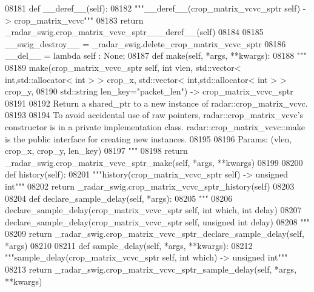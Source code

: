 \begin{DoxyCode}
{{{{{{{{{{{{{{{{{{{{{{{{{{{08181     \textcolor{keyword}{def }__deref__(self):
08182         \textcolor{stringliteral}{"""\_\_deref\_\_(crop\_matrix\_vcvc\_sptr self) -> crop\_matrix\_vcvc"""}
08183         \textcolor{keywordflow}{return} \_radar\_swig.crop\_matrix\_vcvc\_sptr\_\_\_deref\_\_(self)
08184 
08185     \_\_swig\_destroy\_\_ = \_radar\_swig.delete\_crop\_matrix\_vcvc\_sptr
08186     \_\_del\_\_ = \textcolor{keyword}{lambda} self : \textcolor{keywordtype}{None};
08187     \textcolor{keyword}{def }make(self, *args, **kwargs):
08188         \textcolor{stringliteral}{"""}
08189 \textcolor{stringliteral}{        make(crop\_matrix\_vcvc\_sptr self, int vlen, std::vector< int,std::allocator< int > > crop\_x,
       std::vector< int,std::allocator< int > > crop\_y, }
08190 \textcolor{stringliteral}{            std::string len\_key="packet\_len") -> crop\_matrix\_vcvc\_sptr}
08191 \textcolor{stringliteral}{}
08192 \textcolor{stringliteral}{        Return a shared\_ptr to a new instance of radar::crop\_matrix\_vcvc.}
08193 \textcolor{stringliteral}{}
08194 \textcolor{stringliteral}{        To avoid accidental use of raw pointers, radar::crop\_matrix\_vcvc's constructor is in a private
       implementation class. radar::crop\_matrix\_vcvc::make is the public interface for creating new instances.}
08195 \textcolor{stringliteral}{}
08196 \textcolor{stringliteral}{        Params: (vlen, crop\_x, crop\_y, len\_key)}
08197 \textcolor{stringliteral}{        """}
08198         \textcolor{keywordflow}{return} \_radar\_swig.crop\_matrix\_vcvc\_sptr\_make(self, *args, **kwargs)
08199 
08200     \textcolor{keyword}{def }history(self):
08201         \textcolor{stringliteral}{"""history(crop\_matrix\_vcvc\_sptr self) -> unsigned int"""}
08202         \textcolor{keywordflow}{return} \_radar\_swig.crop\_matrix\_vcvc\_sptr\_history(self)
08203 
08204     \textcolor{keyword}{def }declare_sample_delay(self, *args):
08205         \textcolor{stringliteral}{"""}
08206 \textcolor{stringliteral}{        declare\_sample\_delay(crop\_matrix\_vcvc\_sptr self, int which, int delay)}
08207 \textcolor{stringliteral}{        declare\_sample\_delay(crop\_matrix\_vcvc\_sptr self, unsigned int delay)}
08208 \textcolor{stringliteral}{        """}
08209         \textcolor{keywordflow}{return} \_radar\_swig.crop\_matrix\_vcvc\_sptr\_declare\_sample\_delay(self, *args)
08210 
08211     \textcolor{keyword}{def }sample_delay(self, *args, **kwargs):
08212         \textcolor{stringliteral}{"""sample\_delay(crop\_matrix\_vcvc\_sptr self, int which) -> unsigned int"""}
08213         \textcolor{keywordflow}{return} \_radar\_swig.crop\_matrix\_vcvc\_sptr\_sample\_delay(self, *args, **kwargs)
}}}}}}}}}}}}}}}}}}}}}}}}}}}
\end{DoxyCode}

